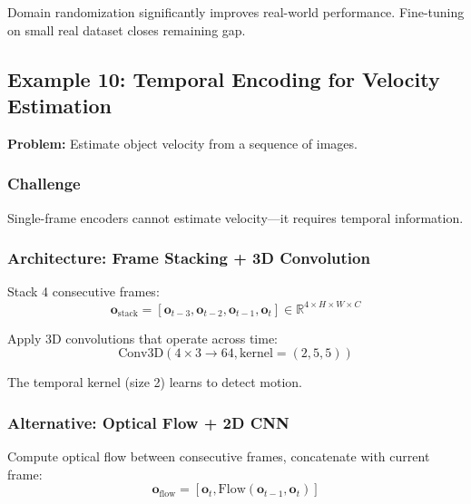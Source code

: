 Domain randomization significantly improves real-world performance. Fine-tuning on small real dataset closes remaining gap.


\subsection{Example 10: Temporal Encoding for Velocity Estimation}

\textbf{Problem:} Estimate object velocity from a sequence of images.

\subsubsection{Challenge}

Single-frame encoders cannot estimate velocity---it requires temporal information.

\subsubsection{Architecture: Frame Stacking + 3D Convolution}

Stack 4 consecutive frames:
\begin{equation}
\mathbf{o}_{\text{stack}} = [\mathbf{o}_{t-3}, \mathbf{o}_{t-2}, \mathbf{o}_{t-1}, \mathbf{o}_t] \in \mathbb{R}^{4 \times H \times W \times C}
\label{eq:frame_stack}
\end{equation}

Apply 3D convolutions that operate across time:
\begin{equation}
\text{Conv3D}(4 \times 3 \rightarrow 64, \text{kernel}=(2, 5, 5))
\label{eq:conv3d}
\end{equation}

The temporal kernel (size 2) learns to detect motion.

\subsubsection{Alternative: Optical Flow + 2D CNN}

Compute optical flow between consecutive frames, concatenate with current frame:
\begin{equation}
\mathbf{o}_{\text{flow}} = [\mathbf{o}_t, \text{Flow}(\mathbf{o}_{t-1}, \mathbf{o}_t)]
\label{eq:optical_flow_input}
\end{equation}

